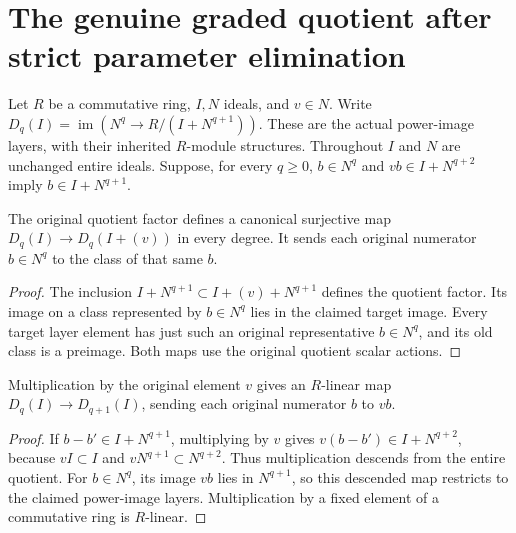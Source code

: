\section{The genuine graded quotient after strict parameter elimination}

Let $R$ be a commutative ring, $I,N$ ideals, and $v\in N$. Write
$D_q(I)=\operatorname{im}(N^q\to R/(I+N^{q+1}))$. These are the actual
power-image layers, with their inherited $R$-module structures. Throughout
$I$ and $N$ are unchanged entire ideals. Suppose, for every $q\geq0$,
$b\in N^q$ and $vb\in I+N^{q+2}$ imply $b\in I+N^{q+1}$.

\begin{theorem}
\label{hir:strict-parameter-layer-map-surjective}
\leanok
The original quotient factor defines a canonical surjective map
$D_q(I)\to D_q(I+(v))$ in every degree. It sends each original numerator
$b\in N^q$ to the class of that same $b$.
\end{theorem}
\begin{proof}
The inclusion $I+N^{q+1}\subset I+(v)+N^{q+1}$ defines the quotient
factor. Its image on a class represented by $b\in N^q$ lies in the
claimed target image. Every target layer element has just such an
original representative $b\in N^q$, and its old class is a preimage.
Both maps use the original quotient scalar actions.
\end{proof}

\begin{theorem}
\label{hir:strict-parameter-symbol-map}
\leanok
Multiplication by the original element $v$ gives an $R$-linear map
$D_q(I)\to D_{q+1}(I)$, sending each original numerator $b$ to $vb$.
\end{theorem}
\begin{proof}
If $b-b'\in I+N^{q+1}$, multiplying by $v$ gives
$v(b-b')\in I+N^{q+2}$, because $vI\subset I$ and
$vN^{q+1}\subset N^{q+2}$. Thus multiplication descends from the entire
quotient. For $b\in N^q$, its image $vb$ lies in $N^{q+1}$, so this
descended map restricts to the claimed power-image layers. Multiplication
by a fixed element of a commutative ring is $R$-linear.
\end{proof}


